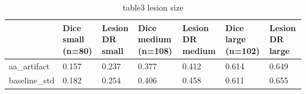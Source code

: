 \begin{table}
\caption{table3 lesion size}
\label{tab:table3_lesion_size}
\begin{tabular}{lllllll}
\toprule
 & Dice small (n=80) & Lesion DR small & Dice medium (n=108) & Lesion DR medium & Dice large (n=102) & Lesion DR large \\
\midrule
aa\_artifact & 0.157 & 0.237 & 0.377 & 0.412 & 0.614 & 0.649 \\
baseline\_std & 0.182 & 0.254 & 0.406 & 0.458 & 0.611 & 0.655 \\
\bottomrule
\end{tabular}
\end{table}
